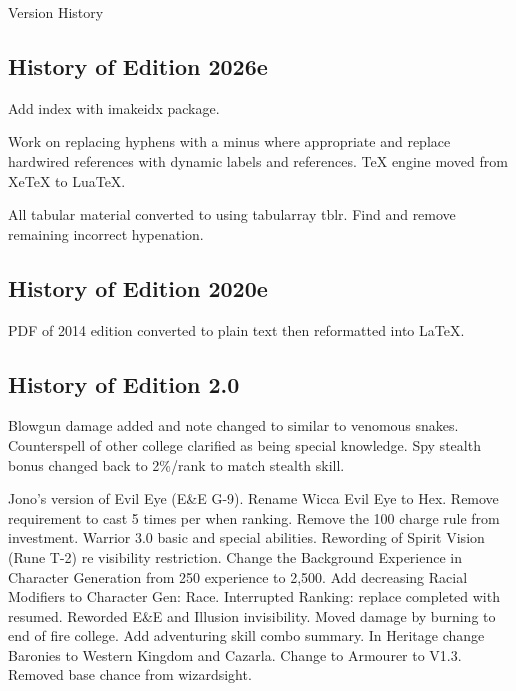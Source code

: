 \begin{Chapter}{Version History}

\subsection{History of Edition 2026e}

\begin{Description}

\item[June 2026] Add index with imakeidx package.
  
\item[March 2025] Work on replacing hyphens with a minus where
  appropriate and replace hardwired references with dynamic labels and
  references.  \TeX{} engine moved from Xe\TeX{} to Lua\TeX{}.
    
\item[January 2024] All tabular material converted to using
  tabularray tblr.  Find and remove remaining incorrect hypenation.

\subsection{History of Edition 2020e}

\item[September 2020] PDF of 2014 edition converted to plain
text then reformatted into \LaTeX.

\end{Description}

\subsection{History of Edition 2.0}

\begin{Description}

\item[September 2014] Blowgun damage added and note changed to similar
  to venomous snakes.  Counterspell of other college clarified as
  being special knowledge.  Spy stealth bonus changed back to 2\%/rank
  to match stealth skill.

\item[May 2014] Jono's version of Evil Eye (E\&E G-9).  Rename Wicca
  Evil Eye to Hex.  Remove requirement to cast 5 times per when
  ranking.  Remove the 100 charge rule from investment.  Warrior 3.0
  basic and special abilities.  Rewording of Spirit Vision (Rune T-2)
  re visibility restriction.  Change the Background Experience in
  Character Generation from 250 experience to 2,500.  Add decreasing
  Racial Modifiers to Character Gen: Race.  Interrupted Ranking:
  replace completed with resumed.  Reworded E\&E and Illusion
  invisibility.  Moved damage by burning to end of fire college.  Add
  adventuring skill combo summary.  In Heritage change Baronies to
  Western Kingdom and Cazarla.  Change to Armourer to V1.3.  Removed
  base chance from wizardsight.


\end{Description}
\end{Chapter}
